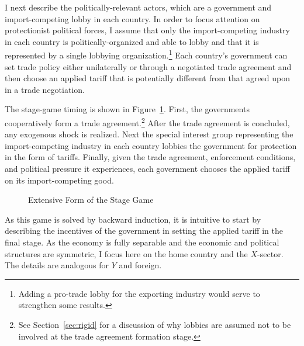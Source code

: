 \documentclass[12pt]{article}
\begin{document}
I next describe the politically-relevant actors, which are a government and import-competing lobby in each country. In order to focus attention on protectionist political forces, I assume that only the import-competing industry in each country is politically-organized and able to lobby and that it is represented by a single lobbying organization.\footnote{Adding a pro-trade lobby for the exporting industry would serve to strengthen some results.} Each country's government can set trade policy either unilaterally or through a negotiated trade agreement and then choose an applied tariff that is potentially different from that agreed upon in a trade negotiation.

The stage-game timing is shown in Figure~\ref{fig:ext}. First, the governments cooperatively form a trade agreement.\footnote{See Section~\ref{sec:rigid} for a discussion of why lobbies are assumed not to be involved at the trade agreement formation stage.} After the trade agreement is concluded, any exogenous shock is realized. Next the special interest group representing the import-competing industry in each country lobbies the government for protection in the form of tariffs. Finally, given the trade agreement, enforcement conditions, and political pressure it experiences, each government chooses the applied tariff on its import-competing good.

\begin{figure}
	\begin{center}
		
	\end{center}
	\caption{Extensive Form of the Stage Game\label{fig:ext}}
\end{figure}


As this game is solved by backward induction, it is intuitive to start by describing the incentives of the government in setting the applied tariff in the final stage. As the economy is fully separable and the economic and political structures are symmetric, I focus here on the home country and the $X$-sector. The details are analogous for $Y$ and foreign.
\end{document}
